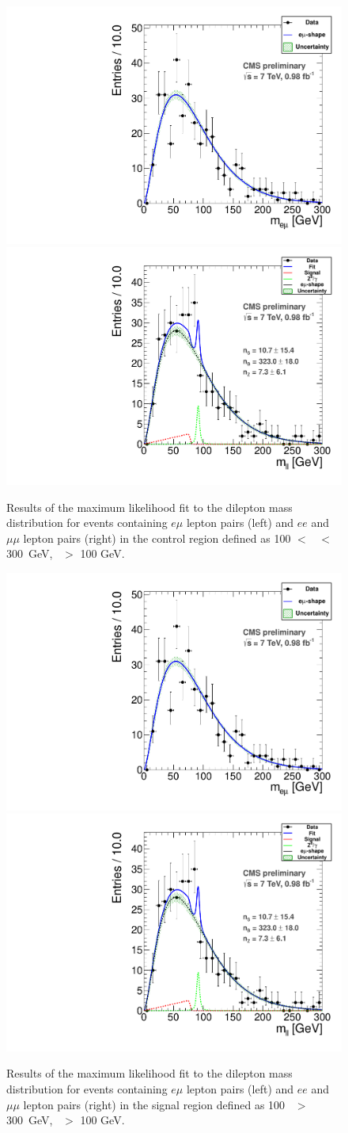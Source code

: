 \begin{figure}[hbt]
\begin{center}
\includegraphics[width=0.48\linewidth]{plots_final/fit2011OFOS_Control_Data.pdf}
\includegraphics[width=0.48\linewidth]{plots_final/fit2011_Control_Data.pdf}
\caption{\label{fig:dilmasscontrol}\protect 
Results of the maximum likelihood fit to the dilepton mass distribution for events containing 
$e\mu$ lepton pairs (left) and $ee$ and $\mu\mu$ lepton pairs (right) in the control
region defined as 100 $<$ \Ht\ $<$ 300~GeV, \MET\ $>$ 100 GeV.
}
\end{center}
\end{figure}

\begin{figure}[hbt]
\begin{center}
\includegraphics[width=0.48\linewidth]{plots_final/fit2011OFOS_Control_Data.pdf}
\includegraphics[width=0.48\linewidth]{plots_final/fit2011_Control_Data.pdf}
\caption{\label{fig:dilmass}\protect 
Results of the maximum likelihood fit to the dilepton mass distribution for events containing 
$e\mu$ lepton pairs (left) and $ee$ and $\mu\mu$ lepton pairs (right) in the signal
region defined as 100 \Ht\ $>$ 300~GeV, \MET\ $>$ 100 GeV.
}
\end{center}
\end{figure}

